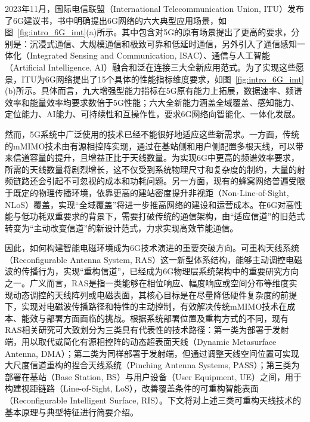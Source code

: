 2023年11月，国际电信联盟（International Telecommunication Union, ITU）发布了6G建议书\cite{ITU2023M2160}，书中明确提出6G网络的六大典型应用场景，如图~\ref{fig:intro_6G_imt}(a)所示。其中包含对5G的原有场景提出了更高的要求，分别是：沉浸式通信、大规模通信和极致可靠和低延时通信，另外引入了通信感知一体化（Integrated Sensing and Communication, ISAC）、通信与人工智能（Artificial Intelligence, AI）融合和泛在连接三大全新应用范式。为了实现这些愿景，ITU为6G网络提出了15个具体的性能指标维度要求，如图~\ref{fig:intro_6G_imt}(b)所示。具体而言，九大增强型能力指标在5G原有能力上拓展，数据速率、频谱效率和能量效率均要求数倍于5G性能；六大全新能力涵盖全域覆盖、感知能力、定位能力、AI能力、可持续性和互操作性，要求6G网络向智能化、一体化发展。

然而，5G系统中广泛使用的技术已经不能很好地适应这些新需求。一方面，传统的mMIMO技术由有源相控阵实现，通过在基站侧和用户侧配置多根天线，可以带来信道容量的提升，且增益正比于天线数量\cite{asplund2020advanced,bjornson2016massive,yin2020addressing}。为实现6G中更高的频谱效率要求，所需的天线数量将剧烈增长，这不仅受到系统物理尺寸和复杂度的制约，大量的射频链路还会引起不可忽视的成本和功耗问题\cite{dohler2010cooperative}。另一方面，现有的蜂窝网络普遍受限于既定的物理传播环境，依靠更高的建站密度提升非视距（Non-Line-of-Sight, NLoS）覆盖，实现“全域覆盖”将进一步推高网络的建设和运营成本。在6G对高性能与低功耗双重要求的背景下，需要打破传统的通信架构，由“适应信道”的旧范式转变为“主动改变信道”的新设计范式，力求实现高效节能通信。

因此，如何构建智能电磁环境成为6G技术演进的重要突破方向。可重构天线系统（Reconfigurable Antenna System, RAS）这一新型体系结构，能够主动调控电磁波的传播行为，实现“重构信道”，已经成为6G物理层系统架构中的重要研究方向之一。广义而言，RAS是指一类能够在相位响应、幅度响应或空间分布等维度实现动态调控的天线阵列或电磁表面，其核心目标是在尽量降低硬件复杂度的前提下，实现对电磁波传播路径和特性的主动控制，有效解决传统mMIMO技术在成本、能效与部署方面面临的挑战。根据系统部署位置及重构方式的不同，现有RAS相关研究可大致划分为三类具有代表性的技术路径：第一类为部署于发射端，用以取代或简化有源相控阵的动态超表面天线（Dynamic Metasurface Antenna, DMA）\cite{smith2017analysisa}；第二类为同样部署于发射端，但通过调整天线空间位置可实现大尺度信道重构的捏合天线系统（Pinching Antenna Systems, PASS）\cite{ding2025flexibleantenna}；第三类为部署在基站（Base Station, BS）与用户设备（User Equipment, UE）之间，用于构建视距链路（Line-of-Sight, LoS），改善覆盖条件的可重构智能表面（Reconfigurable Intelligent Surface, RIS）\cite{zhou2020jiyu,liu2021reconfigurable}。下文将对上述三类可重构天线技术的基本原理与典型特征进行简要介绍。

